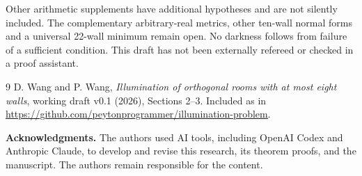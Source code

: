 \documentclass[11pt]{article}
\theoremstyle{definition}
\begin{document}
Other arithmetic supplements have additional hypotheses and are not silently included. The complementary arbitrary-real metrics, other ten-wall normal forms and a universal 22-wall minimum remain open. No darkness follows from failure of a sufficient condition. This draft has not been externally refereed or checked in a proof assistant.

\begin{thebibliography}{9}
 D. Wang and P. Wang, \emph{Illumination of orthogonal rooms with at most eight walls}, working draft v0.1 (2026), Sections 2--3. Included as  in \url{https://github.com/peytonprogrammer/illumination-problem}.
\end{thebibliography}

\smallskip\noindent\textbf{Acknowledgments.} The authors used AI tools, including OpenAI Codex and Anthropic Claude, to develop and revise this research, its theorem proofs, and the manuscript. The authors remain responsible for the content.
\end{document}
